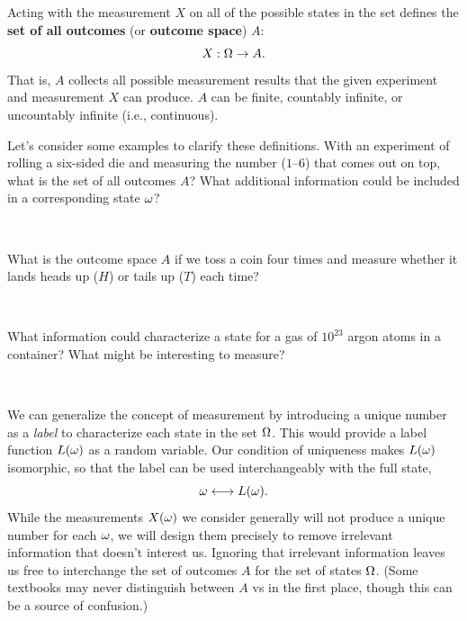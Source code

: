 Acting with the measurement $X$ on all of the possible states in the set \Om defines the \textbf{set of all outcomes} (or \textbf{outcome space}) $A$:
\begin{equation*}
  X: \Omega \to A.
\end{equation*}
That is, $A$ collects all possible measurement results that the given experiment \cE and measurement $X$ can produce.
$A$ can be finite, countably infinite, or uncountably infinite (i.e., continuous).

Let's consider some examples to clarify these definitions.
With an experiment of rolling a six-sided die and measuring the number ($1$--$6$) that comes out on top, what is the set of all outcomes $A$?
What additional information could be included in a corresponding state $\omega$?
\begin{mdframed}
  \ \\[75 pt] %
\end{mdframed}
What is the outcome space $A$ if we toss a coin four times and measure whether it lands heads up ($H$) or tails up ($T$) each time? %
\begin{mdframed}
  \ \\[75 pt] %
\end{mdframed}
What information could characterize a state \om for a gas of $10^{23}$ argon atoms in a container?
What might be interesting to measure?
\begin{mdframed}
  \ \\[95 pt] %
\end{mdframed}

We can generalize the concept of measurement by introducing a unique number as a \textit{label} to characterize each state \om in the set $\Omega$.
This would provide a label function $L(\omega)$ as a random variable.
Our condition of uniqueness makes $L(\omega)$ isomorphic, so that the label can be used interchangeably with the full state,
\begin{equation*}
  \omega \longleftrightarrow L(\omega).
\end{equation*}
While the measurements $X(\omega)$ we consider generally will not produce a unique number for each $\omega$, we will design them precisely to remove irrelevant information that doesn't interest us.
Ignoring that irrelevant information leaves us free to interchange the set of outcomes $A$ for the set of states $\Omega$.
(Some textbooks may never distinguish between $A$ vs \Om in the first place, though this can be a source of confusion.)

